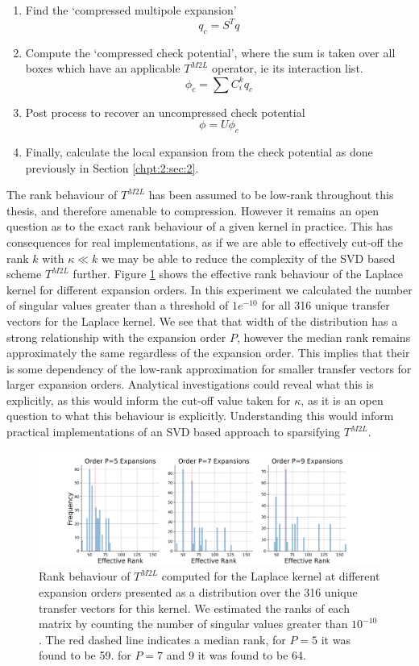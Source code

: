 \begin{enumerate}
    \item Find the `compressed multipole expansion'
    \[
    q_c = S^T q
    \]
    \item Compute the `compressed check potential', where the sum is taken over all boxes which have an applicable $T^{M2L}$ operator, ie its interaction list.
    \[
    \phi_c = \sum C^k_i q_c
    \]
    \item Post process to recover an uncompressed check potential
    \[
    \phi = U \phi_c
    \]
    \item Finally, calculate the local expansion from the check potential as done previously in Section \ref{chpt:2:sec:2}.
\end{enumerate}


The rank behaviour of $T^{M2L}$ has been assumed to be low-rank throughout this thesis, and therefore amenable to compression. However it remains an open question as to the exact rank behaviour of a given kernel in practice. This has consequences for real implementations, as if we are able to effectively cut-off the rank $k$ with $\kappa \ll k$ we may be able to reduce the complexity of the SVD based scheme $T^{M2L}$ further. Figure \ref{fig:chpt:3:sec:1:subsec:1:rank_experiment} shows the effective rank behaviour of the Laplace kernel for different expansion orders. In this experiment we calculated the number of singular values greater than a threshold of $1e^{-10}$ for all 316 unique transfer vectors for the Laplace kernel. We see that that width of the distribution has a strong relationship with the expansion order $P$, however the median rank remains approximately the same regardless of the expansion order. This implies that their is some dependency of the low-rank approximation for smaller transfer vectors for larger expansion orders. Analytical investigations could reveal what this is explicitly, as this would inform the cut-off value taken for $\kappa$, as it is an open question to what this behaviour is explicitly. Understanding this would inform practical implementations of an SVD based approach to sparsifying $T^{M2L}$.

\begin{figure}
    \centering
    \includegraphics[width=\textwidth]{images/ch_3/rank_histogram.png}
    \caption{Rank behaviour of $T^{M2L}$ computed for the Laplace kernel at different expansion orders presented as a distribution over the 316 unique transfer vectors for this kernel. We estimated the ranks of each matrix by counting the number of singular values greater than $10^{-10}$. The red dashed line indicates a median rank, for $P=5$ it was found to be 59. for $P=7$ and 9 it was found to be 64.}
    \label{fig:chpt:3:sec:1:subsec:1:rank_experiment}
\end{figure}

